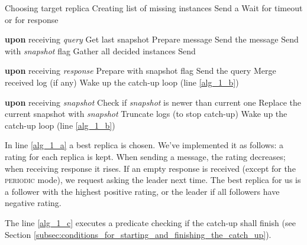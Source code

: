 \begin{algorithmic}[1]
  \REPEAT
    \STATE \label{alg_1_a} Choosing target replica
    \STATE Creating list of missing instances
    \STATE Send a \catchUpQuery
    \STATE \label{alg_1_b} Wait for timeout or for response
  
  \vspace{0.5em}
  
  \STATE \textbf{upon} receiving \catchUpQuery \textit{query}
      \STATE Get last snapshot
      \STATE Prepare \catchUpSnapshot message
      \STATE Send the message
      \STATE Send \catchUpResponse with \textit{snapshot} flag
    \ELSE
      \STATE Gather all decided instances
      \STATE Send \catchUpResponse
    \ENDIF

  \vspace{0.5em}
  \STATE \textbf{upon} receiving \catchUpResponse \textit{response}
      \STATE Prepare \catchUpQuery with snapshot flag
      \STATE Send the query
    \ELSE
      \STATE Merge received log (if any)
      \STATE Wake up the catch-up loop (line \ref{alg_1_b})
    \ENDIF
  
  \vspace{0.5em}
  \STATE \textbf{upon} receiving \catchUpSnapshot \textit{snapshot}
  \STATE Check if \textit{snapshot} is newer than current one
  \STATE Replace the current snapshot with \textit{snapshot}
  \STATE Truncate logs (to stop catch-up)
  \STATE Wake up the catch-up loop (line \ref{alg_1_b})

\end{algorithmic}

\vspace{1em}

In line \ref{alg_1_a} a best replica is chosen. We've implemented it as follows: a rating for each replica is kept. When sending a message, the rating decreases; when receiving response it rises. If an empty response is received (except for the \textsc{periodic} mode), we request asking the leader next time. The best replica for us is a follower with the highest positive rating, or the leader if all followers have negative rating.

The line \ref{alg_1_c} executes a predicate checking if the catch-up shall finish (see Section \ref{subsec:conditions_for_starting_and_finishing_the_catch_up}).

